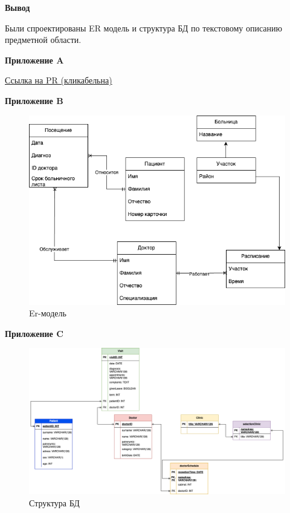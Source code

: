 \documentclass{article}
\begin{document}
\newpage

\textbf{Вывод}

Были спроектированы ER модель и структура БД по текстовому описанию предметной области.

\newpage

\centerline{\textbf{Приложение A}}

\href{https://github.com/moevm/sql-2023-1304/pull/4}{Ссылка на PR (кликабельна)}

\centerline{\textbf{Приложение B}}

\begin{figure}[h]
\centering
\includegraphics[width=1\linewidth]{er.png}
\caption{Er-модель}
\label{fig:mpr}
\end{figure}

\newpage

\centerline{\textbf{Приложение C}}

\begin{figure}[h]
\centering
\includegraphics[width=0.95\linewidth]{bd.png}
\caption{Структура БД}
\label{fig:mpr}
\end{figure}
\end{document}
